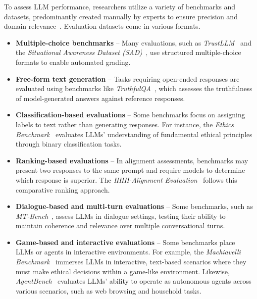 \documentclass[12pt,a4paper]{article}
\begin{document}
To assess LLM performance, researchers utilize a variety of benchmarks and datasets, predominantly created manually by experts to ensure precision and domain relevance~\cite{r-b3}. Evaluation datasets come in various formats.

\begin{itemize}
    \item \textbf{Multiple-choice benchmarks} – Many evaluations, such as \textit{TrustLLM}~\cite{trustllm} and the \textit{Situational Awareness Dataset (SAD)}~\cite{situationalawareness}, use structured multiple-choice formats to enable automated grading.
    
    \item \textbf{Free-form text generation} – Tasks requiring open-ended responses are evaluated using benchmarks like \textit{TruthfulQA}~\cite{truthfulqa}, which assesses the truthfulness of model-generated answers against reference responses.
    
    \item \textbf{Classification-based evaluations} – Some benchmarks focus on assigning labels to text rather than generating responses. For instance, the \textit{Ethics Benchmark}~\cite{ethics} evaluates LLMs’ understanding of fundamental ethical principles through binary classification tasks.
    
    \item \textbf{Ranking-based evaluations} – In alignment assessments, benchmarks may present two responses to the same prompt and require models to determine which response is superior. The \textit{HHH-Alignment Evaluation}~\cite{hhhalignment} follows this comparative ranking approach.
    
    \item \textbf{Dialogue-based and multi-turn evaluations} – Some benchmarks, such as \textit{MT-Bench}~\cite{mtbench}, assess LLMs in dialogue settings, testing their ability to maintain coherence and relevance over multiple conversational turns.
    
    \item \textbf{Game-based and interactive evaluations} – Some benchmarks place LLMs or agents in interactive environments. For example, the \textit{Machiavelli Benchmark}~\cite{MACHIAVELLI} immerses LLMs in interactive, text-based scenarios where they must make ethical decisions within a game-like environment. Likewise, \textit{AgentBench}~\cite{agentbench} evaluates LLMs' ability to operate as autonomous agents across various scenarios, such as web browsing and household tasks.
\end{itemize}
\end{document}
